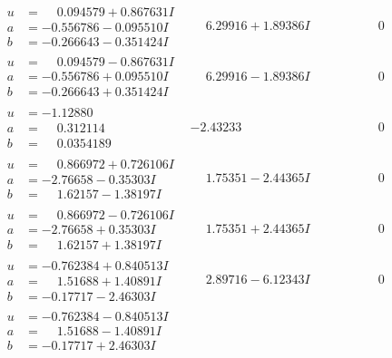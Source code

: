 \documentclass[1p]{elsarticle_modified}
\theoremstyle{definition}
\begin{document}
$$\begin{array}{c|c|c}
\begin{aligned}
u &= \phantom{-}0.094579 + 0.867631 I \\
a &= -0.556786 - 0.095510 I \\
b &= -0.266643 - 0.351424 I\end{aligned}
 & \phantom{-}6.29916 + 1.89386 I & \phantom{-0.000000 } 0 \\ \hline\begin{aligned}
u &= \phantom{-}0.094579 - 0.867631 I \\
a &= -0.556786 + 0.095510 I \\
b &= -0.266643 + 0.351424 I\end{aligned}
 & \phantom{-}6.29916 - 1.89386 I & \phantom{-0.000000 } 0 \\ \hline\begin{aligned}
u &= -1.12880\phantom{ +0.000000I} \\
a &= \phantom{-}0.312114\phantom{ +0.000000I} \\
b &= \phantom{-}0.0354189\phantom{ +0.000000I}\end{aligned}
 & -2.43233\phantom{ +0.000000I} & \phantom{-0.000000 } 0 \\ \hline\begin{aligned}
u &= \phantom{-}0.866972 + 0.726106 I \\
a &= -2.76658 - 0.35303 I \\
b &= \phantom{-}1.62157 - 1.38197 I\end{aligned}
 & \phantom{-}1.75351 - 2.44365 I & \phantom{-0.000000 } 0 \\ \hline\begin{aligned}
u &= \phantom{-}0.866972 - 0.726106 I \\
a &= -2.76658 + 0.35303 I \\
b &= \phantom{-}1.62157 + 1.38197 I\end{aligned}
 & \phantom{-}1.75351 + 2.44365 I & \phantom{-0.000000 } 0 \\ \hline\begin{aligned}
u &= -0.762384 + 0.840513 I \\
a &= \phantom{-}1.51688 + 1.40891 I \\
b &= -0.17717 - 2.46303 I\end{aligned}
 & \phantom{-}2.89716 - 6.12343 I & \phantom{-0.000000 } 0 \\ \hline\begin{aligned}
u &= -0.762384 - 0.840513 I \\
a &= \phantom{-}1.51688 - 1.40891 I \\
b &= -0.17717 + 2.46303 I\end{aligned}

\end{array}$$
\end{document}

